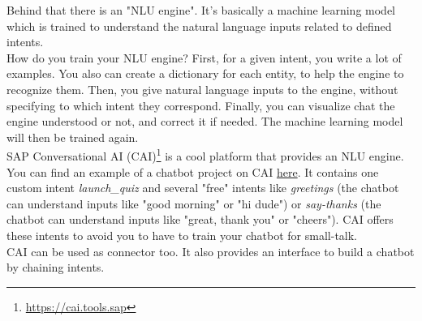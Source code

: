 \documentclass{article}
\begin{document}
Behind that there is an "NLU engine". It's basically a machine learning model which is trained to understand the natural language inputs related to defined intents.\\
How do you train your NLU engine? First, for a given intent, you write a lot of examples. You also can create a dictionary for each entity, to help the engine to recognize them. Then, you  give natural language inputs to the engine, without specifying to which intent they correspond. Finally, you can visualize chat the engine understood or not, and correct it if needed. The machine learning model will then be trained again.\\
\newline
SAP Conversational AI (CAI)\footnote{\url{https://cai.tools.sap}} is a cool platform that provides an NLU engine. You can find an example of a chatbot project on CAI \href{https://cai.tools.sap/lcrepet/quizbot-example}{here}. It contains one custom intent \textit{launch\_quiz} and several "free" intents like \textit{greetings} (the chatbot can understand inputs like "good morning" or "hi dude") or \textit{say-thanks} (the chatbot can understand inputs like "great, thank you" or "cheers"). CAI offers these intents to avoid you to have to train your chatbot for small-talk.\\
CAI can be used as connector too. It also provides an interface to build a chatbot by chaining intents.
\end{document}
